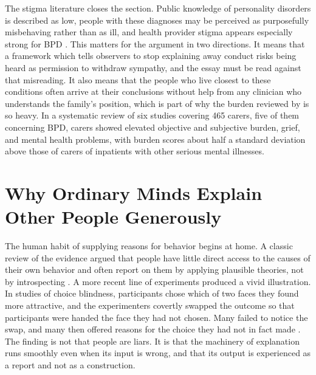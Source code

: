 \documentclass[11pt]{article}
\theoremstyle{definition}
\theoremstyle{remark}
\begin{document}
The stigma literature closes the section. Public knowledge of personality disorders is described as low, people with these diagnoses may be perceived as purposefully misbehaving rather than as ill, and health provider stigma appears especially strong for BPD \citep{sheehan2016}. This matters for the argument in two directions. It means that a framework which tells observers to stop explaining away conduct risks being heard as permission to withdraw sympathy, and the essay must be read against that misreading. It also means that the people who live closest to these conditions often arrive at their conclusions without help from any clinician who understands the family's position, which is part of why the burden reviewed by \citet{bailey2013} is so heavy. In a systematic review of six studies covering 465 carers, five of them concerning BPD, carers showed elevated objective and subjective burden, grief, and mental health problems, with burden scores about half a standard deviation above those of carers of inpatients with other serious mental illnesses.

\section{Why Ordinary Minds Explain Other People Generously}\label{sec:psych}

The human habit of supplying reasons for behavior begins at home. A classic review of the evidence argued that people have little direct access to the causes of their own behavior and often report on them by applying plausible theories, not by introspecting \citep{nisbett1977}. A more recent line of experiments produced a vivid illustration. In studies of choice blindness, participants chose which of two faces they found more attractive, and the experimenters covertly swapped the outcome so that participants were handed the face they had not chosen. Many failed to notice the swap, and many then offered reasons for the choice they had not in fact made \citep{johansson2005}. The finding is not that people are liars. It is that the machinery of explanation runs smoothly even when its input is wrong, and that its output is experienced as a report and not as a construction.
\end{document}
